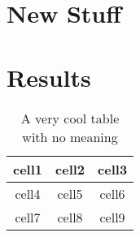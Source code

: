 \chapter{New Stuff}
\lipsum[21-40]

\chapter{Results}
\begin{table}
  \centering
  \label{table:one}
\begin{tabular}{ c c c }
 cell1 & cell2 & cell3 \\ \hline
 cell4 & cell5 & cell6 \\ \hline
 cell7 & cell8 & cell9    
\end{tabular}
  \caption{A very cool table with no meaning}
\end{table}
\lipsum[41-60]

